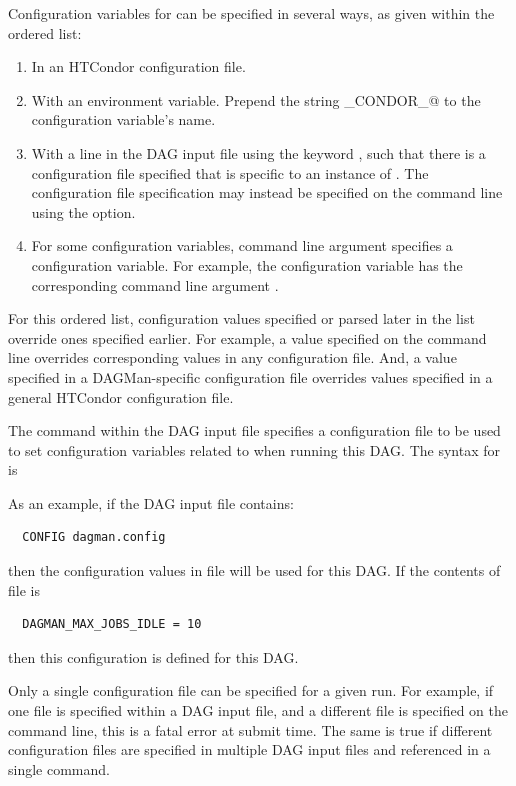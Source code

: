Configuration variables for  can be specified in several
ways, as given within the ordered list:
\begin{enumerate}
\item
In an HTCondor configuration file.
\item
With an environment variable.
Prepend the string \verb@_CONDOR_@ to the configuration variable's name.
\item
With a line in the DAG input file using the keyword , 
such that there is a configuration file specified
that is specific to an instance of .
The configuration file specification may instead be specified
on the  command line using the  option.
\item
For some configuration variables,
 command line argument specifies a configuration variable. 
For example, the configuration variable 
has the corresponding command line argument .
\end{enumerate}

For this ordered list, 
configuration values specified or parsed later in the list
override ones specified earlier.
For example, a value specified on the
 command line overrides corresponding values in any
configuration file.
And, a value specified in a DAGMan-specific configuration
file overrides values specified in a general HTCondor configuration file.

The  command within the DAG input file specifies a 
configuration file to be used to set configuration variables 
related to  when running this DAG.
The syntax for  is

 

As an example, if the DAG input file contains:
\begin{verbatim}
  CONFIG dagman.config
\end{verbatim}
then the configuration values in file  will be used
for this DAG.
If the contents of file  is 
\begin{verbatim}
  DAGMAN_MAX_JOBS_IDLE = 10
\end{verbatim}
then this configuration is defined for this DAG. 

Only a single configuration file can be specified for a given
 run.  For example, if one file is specified within a DAG
input file,
and a different file is specified on the  command
line, this is a fatal error at submit time.
The same is true if
different configuration files are specified in multiple DAG input files
and referenced in a single  command.

